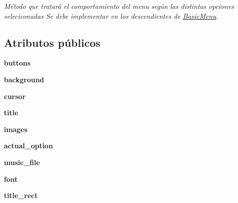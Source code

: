 \begin{DoxyCompactItemize}
\begin{DoxyCompactList}\small\item\em \-Método que tratará el comportamiento del menu según las distintas opciones seleciconadas \-Se debe implementar en los descendientes de \hyperlink{classengine_1_1basicmenu_1_1BasicMenu}{\-Basic\-Menu}. \end{DoxyCompactList}\end{DoxyCompactItemize}
\subsection*{\-Atributos públicos}
\begin{DoxyCompactItemize}
\item 
\hypertarget{classengine_1_1basicmenu_1_1BasicMenu_a06db378a6cb0c0e89d7531c79f812ca4}{
{\bfseries buttons}}
\label{classengine_1_1basicmenu_1_1BasicMenu_a06db378a6cb0c0e89d7531c79f812ca4}

\item 
\hypertarget{classengine_1_1basicmenu_1_1BasicMenu_ae27b1fae4d6274ca216aecfaf2f58b10}{
{\bfseries background}}
\label{classengine_1_1basicmenu_1_1BasicMenu_ae27b1fae4d6274ca216aecfaf2f58b10}

\item 
\hypertarget{classengine_1_1basicmenu_1_1BasicMenu_af8795b17dfc329e71877f0b5b0b63273}{
{\bfseries cursor}}
\label{classengine_1_1basicmenu_1_1BasicMenu_af8795b17dfc329e71877f0b5b0b63273}

\item 
\hypertarget{classengine_1_1basicmenu_1_1BasicMenu_a4d6e809f025fc9ac84a578afc493baaf}{
{\bfseries title}}
\label{classengine_1_1basicmenu_1_1BasicMenu_a4d6e809f025fc9ac84a578afc493baaf}

\item 
\hypertarget{classengine_1_1basicmenu_1_1BasicMenu_a14ebd9d0dbeb274763e6b5b4d2b9f73c}{
{\bfseries images}}
\label{classengine_1_1basicmenu_1_1BasicMenu_a14ebd9d0dbeb274763e6b5b4d2b9f73c}

\item 
\hypertarget{classengine_1_1basicmenu_1_1BasicMenu_a7fc43ec059dff53b90001bf64252546b}{
{\bfseries actual\-\_\-option}}
\label{classengine_1_1basicmenu_1_1BasicMenu_a7fc43ec059dff53b90001bf64252546b}

\item 
\hypertarget{classengine_1_1basicmenu_1_1BasicMenu_a91a095703d10754cb8f0cb0fb38d4e88}{
{\bfseries music\-\_\-file}}
\label{classengine_1_1basicmenu_1_1BasicMenu_a91a095703d10754cb8f0cb0fb38d4e88}

\item 
\hypertarget{classengine_1_1basicmenu_1_1BasicMenu_a8af18beddb65d2616c98dae0a730798d}{
{\bfseries font}}
\label{classengine_1_1basicmenu_1_1BasicMenu_a8af18beddb65d2616c98dae0a730798d}

\item 
\hypertarget{classengine_1_1basicmenu_1_1BasicMenu_a3acac97052bdc9efcc58996f86662dd5}{
{\bfseries title\-\_\-rect}}
\label{classengine_1_1basicmenu_1_1BasicMenu_a3acac97052bdc9efcc58996f86662dd5}

\end{DoxyCompactItemize}


